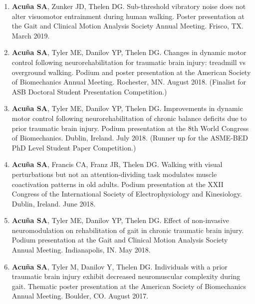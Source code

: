 \documentclass[letterpaper, 10pt]{article}
\begin{document}
\begin{enumerate}
    \item \textbf{Acuña SA}, Zunker JD, Thelen DG. Sub-threshold vibratory noise does not alter visuomotor entrainment during human walking. Poster presentation at the Gait and Clinical Motion Analysis Society Annual Meeting. Frisco, TX. March 2019.
    \item \textbf{Acuña SA}, Tyler ME, Danilov YP, Thelen DG. Changes in dynamic motor control following neurorehabilitation for traumatic brain injury: treadmill vs overground walking. Podium and poster presentation at the American Society of Biomechanics Annual Meeting. Rochester, MN. August 2018. (Finalist for ASB Doctoral Student Presentation Competition.)
    \item \textbf{Acuña SA}, Tyler ME, Danilov YP, Thelen DG. Improvements in dynamic motor control following neurorehabilitation of chronic balance deﬁcits due to prior traumatic brain injury. Podium presentation at the 8th World Congress of Biomechanics. Dublin, Ireland. July 2018. (Runner up for the ASME-BED PhD Level Student Paper Competition.)
    \item \textbf{Acuña SA}, Francis CA, Franz JR, Thelen DG. Walking with visual perturbations but not an attention-dividing task modulates muscle coactivation patterns in old adults. Podium presentation at the XXII Congress of the International Society of Electrophysiology and Kinesiology. Dublin, Ireland. June 2018.
    \item \textbf{Acuña SA}, Tyler ME, Danilov YP, Thelen DG. Effect of non-invasive neuromodulation on rehabilitation of gait in chronic traumatic brain injury. Podium presentation at the Gait and Clinical Motion Analysis Society Annual Meeting. Indianapolis, IN. May 2018.
    \item \textbf{Acuña SA}, Tyler M, Danilov Y, Thelen DG. Individuals with a prior traumatic brain injury exhibit decreased neuromuscular complexity during gait. Thematic poster presentation at the American Society of Biomechanics Annual Meeting. Boulder, CO. August 2017.

\end{enumerate}
\end{document}
